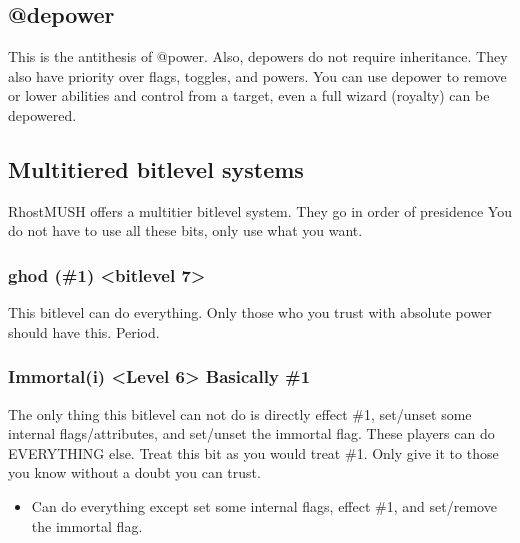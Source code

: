 \documentclass[letterpaper,10pt,english]{sphinxmanual}
\begin{document}
\subsection{@depower}
\label{\detokenize{toggles:depower}}
\sphinxAtStartPar
This is the anti\sphinxhyphen{}thesis of @power.  Also, depowers do not require
inheritance.  They also have priority over flags, toggles, and
powers.  You can use depower to remove or lower abilities and
control from a target, even a full wizard (royalty) can be
depowered.


\subsection{Multi\sphinxhyphen{}tiered bitlevel systems}
\label{\detokenize{toggles:multi-tiered-bitlevel-systems}}
\sphinxAtStartPar
RhostMUSH offers a multi\sphinxhyphen{}tier bitlevel system.  They go in order of presidence
You do not have to use all these bits, only use what you want.


\subsubsection{ghod (\#1) \textless{}bitlevel 7\textgreater{}}
\label{\detokenize{toggles:ghod-1-bitlevel-7}}
\sphinxAtStartPar
This bitlevel can do everything.  Only those who you trust with absolute power should have this.  Period.


\subsubsection{Immortal(i) \textless{}Level 6\textgreater{} \sphinxhyphen{} Basically \#1}
\label{\detokenize{toggles:immortal-i-level-6-basically-1}}
\sphinxAtStartPar
The only thing this bitlevel can not do is directly effect \#1,
set/unset some internal flags/attributes, and set/unset the
immortal flag.  These players can do EVERYTHING else.  Treat
this bit as you would treat \#1.  Only give it to those you know
without a doubt you can trust.
\begin{itemize}
\item {} 
\sphinxAtStartPar
Can do everything except set some internal flags, effect \#1, and set/remove the immortal flag.

\end{itemize}
\end{document}
